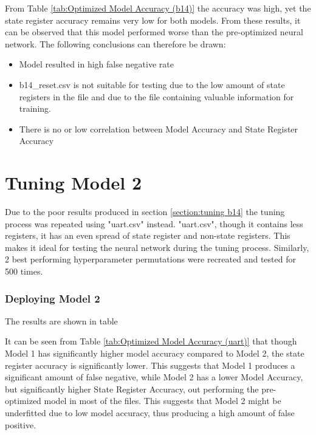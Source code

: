 \documentclass{tum-book}
\begin{document}
        \noindent
        From Table \ref{tab:Optimized Model Accuracy (b14)} the accuracy was high, yet the state register accuracy remains very low for both models. From these results, it can be observed that this model performed worse than the pre-optimized neural network. The following conclusions can therefore be drawn:
        
        \begin{itemize}
            \item Model resulted in high false negative rate
            \item b14\_reset.csv is not suitable for testing due to the low amount of state registers in the file and due to the file containing valuable information for training.
            \item There is no or low correlation between Model Accuracy and State Register Accuracy 
        \end{itemize}
        
    
    \newpage\section{Tuning Model 2}\label{section:tuning uart}
    Due to the poor results produced in section \ref{section:tuning b14} the tuning process was repeated using "uart.csv" instead. "uart.csv", though it contains less registers, it has an even spread of state register and non-state registers. This makes it ideal for testing the neural network during the tuning process. Similarly, 2 best performing hyperparameter permutations were recreated and tested for 500 times.
    
        \begin{table}[ht]
            \centering
            
        \end{table}
    
    \subsubsection{Deploying Model 2}
    The results are shown in table 
    
        \begin{table}[ht]
            \centering
            
        \end{table}
    
    
        \newpage\noindent
        It can be seen from Table \ref{tab:Optimized Model Accuracy (uart)} that though Model 1 has significantly higher model accuracy compared to Model 2, the state register accuracy is significantly lower. This suggests that Model 1 produces a significant amount of false negative, while Model 2 has a lower Model Accuracy, but significantly higher State Register Accuracy, out performing the pre-optimized model in most of the files. This suggests that Model 2 might be underfitted due to low model accuracy, thus producing a high amount of false positive.
        
\end{document}
